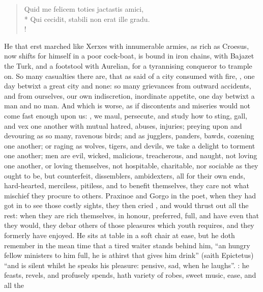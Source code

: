 \begin{latin}
\begin{verse}%
Quid me felicem toties jactastis amici,\\*
Qui cecidit, stabili non erat ille gradu.\\!
\end{verse}%
\end{latin}

He that erst marched like Xerxes with innumerable armies, as rich as Croesus,
now shifts for himself in a poor cock-boat, is bound in iron chains, with
Bajazet the Turk, and a footstool with Aurelian, for a tyrannising conqueror to
trample on. So many casualties there are, that as \Seneca{} said of a city
consumed with fire, ,
one day betwixt a great city and none: so many grievances from outward
accidents, and from ourselves, our own indiscretion, inordinate appetite, one
day betwixt a man and no man. And which is worse, as if discontents and
miseries would not come fast enough upon us: , we maul, persecute, and study how to sting, gall, and vex
one another with mutual hatred, abuses, injuries; preying upon and devouring as
so many, ravenous birds; and as jugglers, panders, bawds,
cozening one another; or raging as wolves, tigers, and
devils, we take a delight to torment one another; men are evil, wicked,
malicious, treacherous, and naught, not loving one
another, or loving themselves, not hospitable, charitable, nor sociable as they
ought to be, but counterfeit, dissemblers, ambidexters, all for their own ends,
hard-hearted, merciless, pitiless, and to benefit themselves, they care not
what mischief they procure to others. Praxinoe and Gorgo
in the poet, when they had got in to see those costly sights, they then cried
, and would thrust out all the rest: when they are rich
themselves, in honour, preferred, full, and have even that they would, they
debar others of those pleasures which youth requires, and they formerly have
enjoyed. He sits at table in a soft chair at ease, but he doth remember in the
mean time that a tired waiter stands behind him, \enquote{an hungry fellow ministers to
him full, he is athirst that gives him drink} (saith
Epictetus) \enquote{and is silent whilst he speaks his pleasure:
pensive, sad, when he laughs}. : he feasts, revels,
and profusely spends, hath variety of robes, sweet music, ease, and all the
